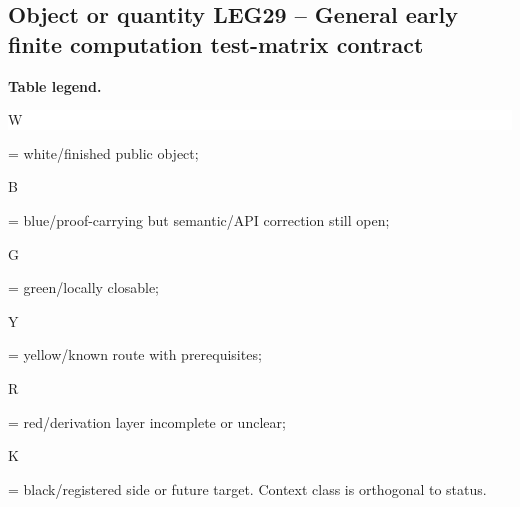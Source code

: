 \subsection*{Object or quantity LEG29 -- General early finite computation test-matrix contract}
\hypertarget{objproof:LEG29}{}
\par\smallskip\noindent\begin{minipage}{0.99\linewidth}\footnotesize\raggedright\textbf{Table legend.} \colorbox{white}{\strut W} = white/finished public object; \colorbox{cyan!20}{\strut B} = blue/proof-carrying but semantic/API correction still open; \colorbox{green!18}{\strut G} = green/locally closable; \colorbox{yellow!25}{\strut Y} = yellow/known route with prerequisites; \colorbox{red!20}{\strut R} = red/derivation layer incomplete or unclear; \colorbox{black!18}{\strut K} = black/registered side or future target. Context class is orthogonal to status.\end{minipage}\par\vspace{0.25em}
